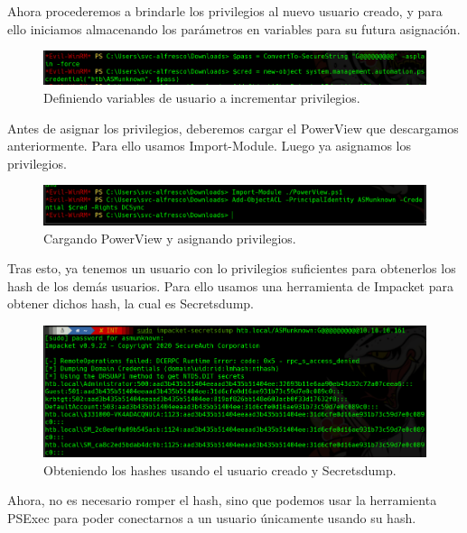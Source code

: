 \documentclass{article}
\begin{document}
Ahora procederemos a brindarle los privilegios al nuevo usuario creado, y para ello iniciamos almacenando los parámetros en variables para su futura asignación.

\begin{figure}[H]
	\center
	\includegraphics[width=\textwidth]{images/forest/definiendo_variables_para_permisosusuarionuevo.png}
	\caption{Definiendo variables de usuario a incrementar privilegios.}
\end{figure}

Antes de asignar los privilegios, deberemos cargar el PowerView que descargamos anteriormente. Para ello usamos Import-Module. Luego ya asignamos los privilegios.

\begin{figure}[H]
	\center
	\includegraphics[width=\textwidth]{images/forest/importando el powerview.png}
	\caption{Cargando PowerView y asignando privilegios.}
\end{figure}

Tras esto, ya tenemos un usuario con lo privilegios suficientes para obtenerlos los hash de los demás usuarios. Para ello usamos una herramienta de Impacket para obtener dichos hash, la cual es Secretsdump.

\begin{figure}[H]
	\center
	\includegraphics[width=\textwidth]{images/forest/usando_secretsdump_hashes.png}
	\caption{Obteniendo los hashes usando el usuario creado y Secretsdump.}
\end{figure}

Ahora, no es necesario romper el hash, sino que podemos usar la herramienta PSExec para poder conectarnos a un usuario únicamente usando su hash.
\end{document}
